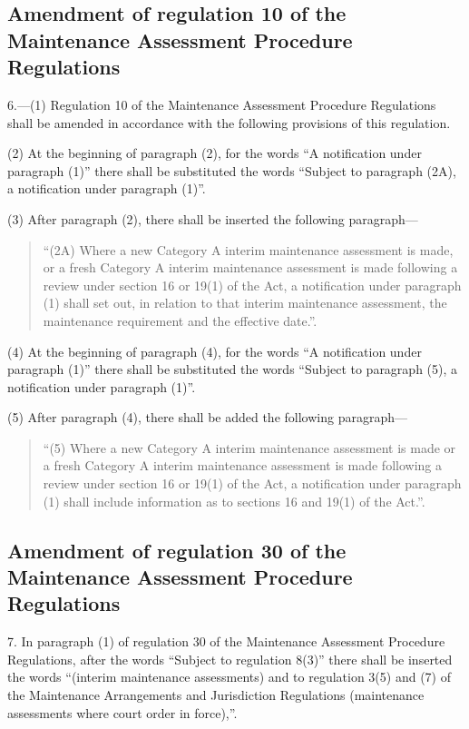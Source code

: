 \documentclass[a4paper]{article}
\begin{document}
\subsection[6. Amendment of regulation 10 of the Maintenance Assessment Procedure Regulations]{Amendment of regulation 10 of the Maintenance Assessment Procedure Regulations}

6.—(1) Regulation 10 of the Maintenance Assessment Procedure Regulations shall be amended in accordance with the following provisions of this regulation.

(2) At the beginning of paragraph (2), for the words “A notification under paragraph (1)” there shall be substituted the words “Subject to paragraph (2A), a notification under paragraph (1)”.

(3) After paragraph (2), there shall be inserted the following paragraph—
\begin{quotation}
“(2A) Where a new Category A interim maintenance assessment is made, or a fresh Category A interim maintenance assessment is made following a review under section 16 or 19(1) of the Act, a notification under paragraph (1) shall set out, in relation to that interim maintenance assessment, the maintenance requirement and the effective date.”.
\end{quotation}

(4) At the beginning of paragraph (4), for the words “A notification under paragraph (1)” there shall be substituted the words “Subject to paragraph (5), a notification under paragraph (1)”.

(5) After paragraph (4), there shall be added the following paragraph—
\begin{quotation}
“(5) Where a new Category A interim maintenance assessment is made or a fresh Category A interim maintenance assessment is made following a review under section 16 or 19(1) of the Act, a notification under paragraph (1) shall include information as to sections 16 and 19(1) of the Act.”.
\end{quotation}

\subsection[7. Amendment of regulation 30 of the Maintenance Assessment Procedure Regulations]{Amendment of regulation 30 of the Maintenance Assessment Procedure Regulations}

7.  In paragraph (1) of regulation 30 of the Maintenance Assessment Procedure Regulations, after the words “Subject to regulation 8(3)” there shall be inserted the words “(interim maintenance assessments) and to regulation 3(5) and (7) of the Maintenance Arrangements and Jurisdiction Regulations (maintenance assessments where court order in force),”.
\end{document}

